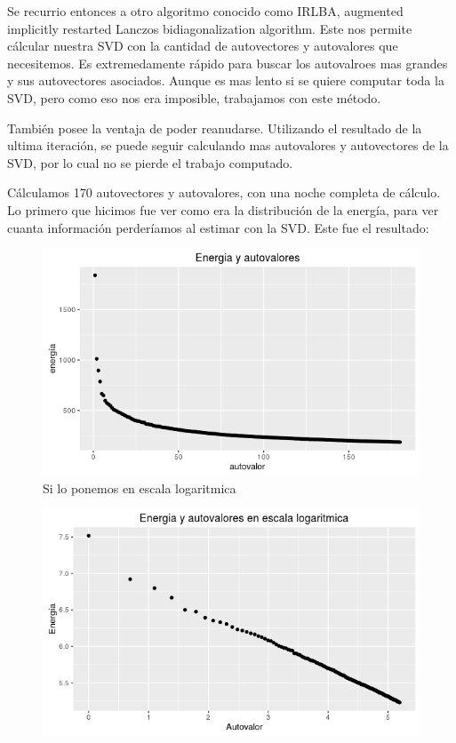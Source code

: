 Se recurrio entonces a otro algoritmo conocido como IRLBA, augmented implicitly restarted Lanczos bidiagonalization algorithm. Este nos permite cálcular nuestra SVD con la cantidad de autovectores y autovalores que necesitemos. Es extremedamente rápido para buscar los autovalroes mas grandes y sus autovectores asociados. Aunque es mas lento si se quiere computar toda la SVD, pero como eso nos era imposible, trabajamos con este método.

También posee la ventaja de poder reanudarse. Utilizando el resultado de la ultima iteración, se puede seguir calculando mas autovalores y autovectores de la SVD, por lo cual no se pierde el trabajo computado.

Cálculamos 170 autovectores y autovalores, con una noche completa de cálculo. Lo primero que hicimos fue ver como era la distribución de la energía, para ver cuanta información perderíamos al estimar con la SVD. Este fue el resultado:

\begin{figure}[h]
{
    \centering
    \includegraphics[width=1\linewidth]{Figures/svd.png}
}
Si lo ponemos en escala logaritmica\par\bigskip
{
    \centering
    \includegraphics[width=1\linewidth]{Figures/svdLog.png}
}
\end{figure}

